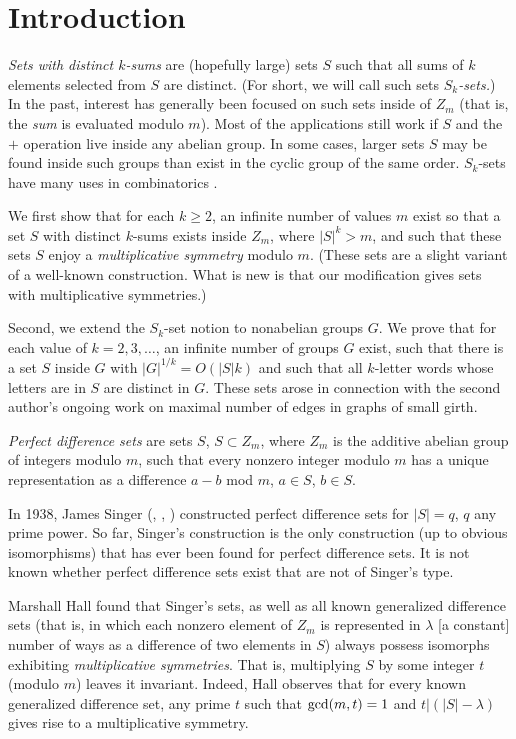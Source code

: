 \section{Introduction}
\hsp
{\em Sets with distinct $k$-sums} are (hopefully large)
sets $S$ such that all sums of
$k$ elements selected from $S$ are distinct.
(For short, we will call such sets {\em $S_k$-sets.})
In the past, interest has generally been focused on such sets
inside of $Z_m$ (that is, the {\em sum} is evaluated modulo $m$).
Most of the applications still work if $S$ and the
$+$ operation live inside any abelian group.
In some cases, larger sets $S$ may be found inside such groups
than exist in the cyclic group of the same order.
$S_k$-sets have many uses in combinatorics
\cite{Chun89,Klov81,Grah80,BSSS90}.


We first show that for each $k \ge 2$, an infinite number
of values $m$ exist so that
a set $S$ with distinct $k$-sums exists
inside $Z_m$, where $|S|^k > m$, and such that these sets
$S$ enjoy a {\em multiplicative symmetry} modulo $m$.
(These sets are a slight variant of a well-known construction. What is
new is that our modification gives sets with multiplicative symmetries.)

Second, we extend the $S_k$-set notion to nonabelian groups $G$.
We prove that for each value of $k = 2 , 3, \dots$,
an infinite number of groups $G$ exist, such that there is
a set $S$ inside $G$ with $|G|^{1/k} = O( |S| k )$ and such that all
$k$-letter words whose letters are in $S$
are distinct in $G$.
These sets arose in connection with the second author's
ongoing work on maximal number of edges in graphs of small girth.

\begin{defn}\label{de1}
{\rm
{\em Perfect difference sets} are
sets $S$, $S \subset Z_m$, where $Z_m$ is the additive abelian group of
integers modulo $m$,
such that every nonzero integer modulo $m$
has a unique representation as a difference $a-b$ mod $m$,
$a \in S$, $b \in S$.
}
\end{defn}

In 1938, James Singer (\cite{Sing38}, \cite{Hall86}, \cite{Sing65})
constructed
perfect difference sets for $|S| = q$, $q$ any prime power.
So far, Singer's construction is the only construction (up to
obvious isomorphisms) that has
ever been found for perfect difference sets. It is not known whether
perfect difference sets exist that are not of Singer's type.

Marshall Hall found that Singer's sets, as well
as all known generalized difference sets (that is,
in which each nonzero
element of $Z_m$ is represented in $\lambda$ [a constant] number of ways as
a difference of two elements in $S$) always possess isomorphs exhibiting
{\em multiplicative symmetries}.
That is, multiplying $S$ by some integer $t$ (modulo
$m$)
leaves  it invariant. Indeed, Hall observes \cite{Hall86}
that for every known generalized
difference set, any prime $t$ such that $\mbox{gcd}(m,t)=1$
and $t | (|S|-\lambda )$ gives rise to a multiplicative symmetry.

